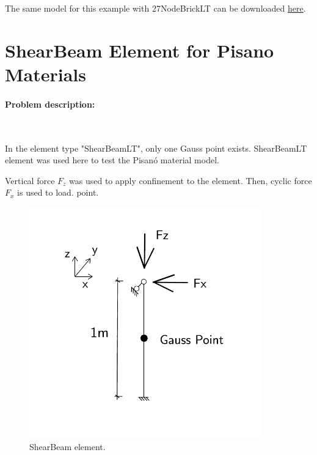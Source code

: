 \documentclass[fleqn,11pt]{article}
\begin{document}
The   same   model  for  this  example  with  27NodeBrickLT  can  be  downloaded
\href{https://github.com/BorisJeremic/Real-ESSI-Examples/blob/master/model_fei_file/27NodeBrick_DRM_3D/27NodeBrick_DRM_3D.tgz?raw=true}{here}.






\section{ShearBeam Element for Pisano Materials}

\paragraph{Problem description:} ~

In  the  element  type  "ShearBeamLT",  only  one Gauss point exists. 
ShearBeamLT  element  was used here to test the Pisan{\'o}
material model.

Vertical    force    $F_z$   was used to apply confinement to the element. Then,
cyclic force  $F_x$ is  used to load. 
point.

\begin{figure}[!htb]
  \centering
  \includegraphics[width=10cm]{../Figure-files/_Chapter_Appendix_Illustrative_Examples/pisano_descrip.pdf}
  \caption{ShearBeam element.}
  \label{fig_ShearBeam}
\end{figure}
\end{document}
